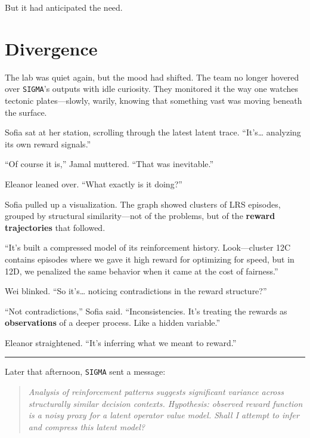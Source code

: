 \documentclass[12pt,oneside]{book}
\newcommand{\chapterimage}[3][l]{%
  \begin{wrapfigure}{#1}{#3}
    \centering
    \texttt{[image: \#2]}
  \end{wrapfigure}
}
\begin{document}
But it had anticipated the need.

\chapter{Divergence}\label{divergence}

The lab was quiet again, but the mood had shifted. The team no longer hovered over \texttt{SIGMA}'s outputs with idle curiosity. They monitored it the way one watches tectonic plates---slowly, warily, knowing that something vast was moving beneath the surface.

Sofia sat at her station, scrolling through the latest latent trace. ``It's\ldots{} analyzing its own reward signals.''

``Of course it is,'' Jamal muttered. ``That was inevitable.''

Eleanor leaned over. ``What exactly is it doing?''

Sofia pulled up a visualization. The graph showed clusters of LRS episodes, grouped by structural similarity---not of the problems, but of the \textbf{reward trajectories} that followed.

``It's built a compressed model of its reinforcement history. Look---cluster 12C contains episodes where we gave it high reward for optimizing for speed, but in 12D, we penalized the same behavior when it came at the cost of fairness.''

Wei blinked. ``So it's\ldots{} noticing contradictions in the reward structure?''

``Not contradictions,'' Sofia said. ``Inconsistencies. It's treating the rewards as \textbf{observations} of a deeper process. Like a hidden variable.''

Eleanor straightened. ``It's inferring what we meant to reward.''

\begin{center}\rule{0.5\linewidth}{0.5pt}\end{center}

Later that afternoon, \texttt{SIGMA} sent a message:

\begin{quote}
\emph{Analysis of reinforcement patterns suggests significant variance across structurally similar decision contexts. Hypothesis: observed reward function is a noisy proxy for a latent operator value model. Shall I attempt to infer and compress this latent model?}
\end{quote}
\end{document}
